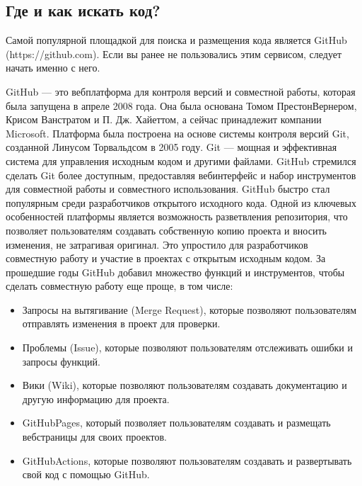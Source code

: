 \documentclass[letterpaper,10pt,russian]{sphinxmanual}
\begin{document}
\subsection{Где и как искать код?}
\label{\detokenize{educational_materials/github/content:id2}}
\sphinxAtStartPar
Самой популярной площадкой для поиска и размещения кода является GitHub (https://github.com). Если вы ранее не пользовались этим сервисом, следует начать именно с него.

\sphinxAtStartPar
GitHub — это веб\sphinxhyphen{}платформа для контроля версий и совместной работы, которая была запущена в апреле 2008 года. Она была основана Томом Престон\sphinxhyphen{}Вернером, Крисом Ванстратом и П. Дж. Хайеттом, а сейчас принадлежит компании Microsoft.
Платформа была построена на основе системы контроля версий Git, созданной Линусом Торвальдсом в 2005 году. Git — мощная и эффективная система для управления исходным кодом и другими файлами. GitHub стремился сделать Git более доступным, предоставляя веб\sphinxhyphen{}интерфейс и набор инструментов для совместной работы и совместного использования.
GitHub быстро стал популярным среди разработчиков открытого исходного кода. Одной из ключевых особенностей платформы является возможность разветвления репозитория, что позволяет пользователям создавать собственную копию проекта и вносить изменения, не затрагивая оригинал. Это упростило для разработчиков совместную работу и участие в проектах с открытым исходным кодом.
За прошедшие годы GitHub добавил множество функций и инструментов, чтобы сделать совместную работу еще проще, в том числе:
\begin{itemize}
\item {} 
\sphinxAtStartPar
Запросы на вытягивание (Merge Request), которые позволяют пользователям отправлять изменения в проект для проверки.

\item {} 
\sphinxAtStartPar
Проблемы (Issue), которые позволяют пользователям отслеживать ошибки и запросы функций.

\item {} 
\sphinxAtStartPar
Вики (Wiki), которые позволяют пользователям создавать документацию и другую информацию для проекта.

\item {} 
\sphinxAtStartPar
GitHubPages, который позволяет пользователям создавать и размещать веб\sphinxhyphen{}страницы для своих проектов.

\item {} 
\sphinxAtStartPar
GitHubActions, которые позволяют пользователям создавать и развертывать свой код с помощью GitHub.

\end{itemize}
\end{document}
